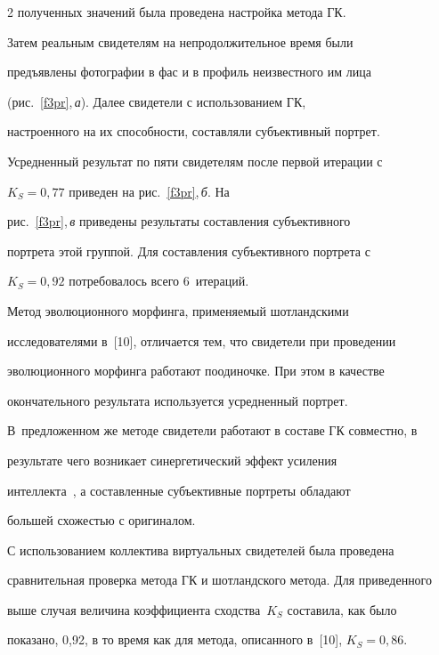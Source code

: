 \begin{multicols}{2}
полученных значений была проведена настройка метода ГК.


     


     Затем реальным свидетелям на непродолжительное время были 


предъявлены фотографии в фас и в профиль неизвестного им лица 


(рис.~\ref{f3pr},\,\textit{а}). Далее свидетели с использованием ГК, 


настроенного на их способности, составляли субъективный портрет. 


Усредненный результат по пяти свидетелям после первой итерации с 


$K_S = 0{,}77$ приведен на рис.~\ref{f3pr},\,\textit{б}. На 


рис.~\ref{f3pr},\,\textit{в} приведены результаты со\-став\-ле\-ния субъективного 


портрета этой группой. Для составления субъективного портрета с 


$K_S = 0{,}92$ потребовалось всего 6~итераций. 








     Метод эволюционного морфинга, при\-ме\-ня\-емый шотландскими 


исследователями в~[10], отличается тем, что свидетели при проведении 


эволюционного морфинга работают поодиночке. При этом в качестве 


окончательного результата используется усредненный портрет. 


В~предложенном же методе свидетели работают в составе ГК совместно, в 


результате чего возникает синергетический эффект усиления 


интеллекта~\cite{4pr}, а составленные субъективные портреты обладают 


большей схо\-жестью с оригиналом. 


     


     С использованием коллектива виртуальных свидетелей была проведена 


сравнительная проверка метода ГК и шотландского метода. Для приведенного 


выше случая величина коэффициента сходства~$K_S$ составила, как было 


показано, 0,92, в то время как для метода, описанного в~[10], $K_S = 0{,}86$. 



\end{multicols}
